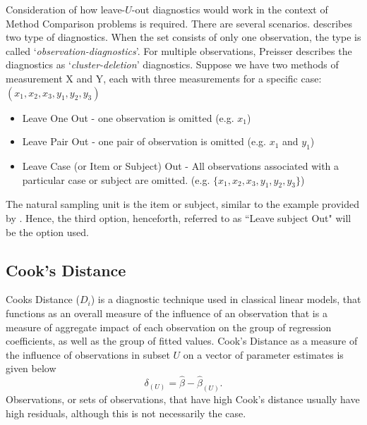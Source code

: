 \documentclass[12pt, a4paper]{report}
\theoremstyle{plain}
\theoremstyle{definition}
\theoremstyle{remark}
\begin{document}
Consideration of how leave-$U$-out diagnostics would work in the context of Method Comparison problems is required. There are several scenarios. \citet{preisser} describes two type of diagnostics. When the set consists of only one observation, the type is called
`\textit{observation-diagnostics}'. For multiple observations, Preisser describes the diagnostics as `\textit{cluster-deletion}' diagnostics. Suppose we have two methods of measurement X and Y, each with three measurements for a specific case: $(x_1,x_2,x_3,y_1,y_2,y_3)$

\begin{itemize}
	\item Leave One Out - one observation is omitted (e.g. $x_1$)
	\item Leave Pair Out - one pair of observation  is omitted (e.g. $x_1$ and $y_1$)
	\item Leave Case (or Item or Subject) Out - All observations associated with a particular case or subject are omitted. (e.g. $\{x_1,x_2,x_3,y_1,y_2,y_3\}$)
\end{itemize}

The natural sampling unit is the item or subject, similar to the example provided by \citet{schabenberger}. Hence, the third option, henceforth, referred to as ``Leave subject Out" will be the option used.




\subsection{Cook's Distance}
 Cooks Distance ($D_{i}$) is a diagnostic technique used in classical linear models, that functions as an overall measure of the influence of an observation that is a measure of aggregate impact of each observation on the group of regression coefficients, as well as the group of fitted values.  Cook's Distance as a measure of the influence of observations in subset $U$ on a vector of parameter estimates is given below \citep{cook77}
	\[ \delta_{(U)} = \hat{\beta} - \hat{\beta}_{(U)}.\]
Observations, or sets of observations, that have high Cook's distance usually have high residuals, although this is not necessarily the case.
	
\end{document}
